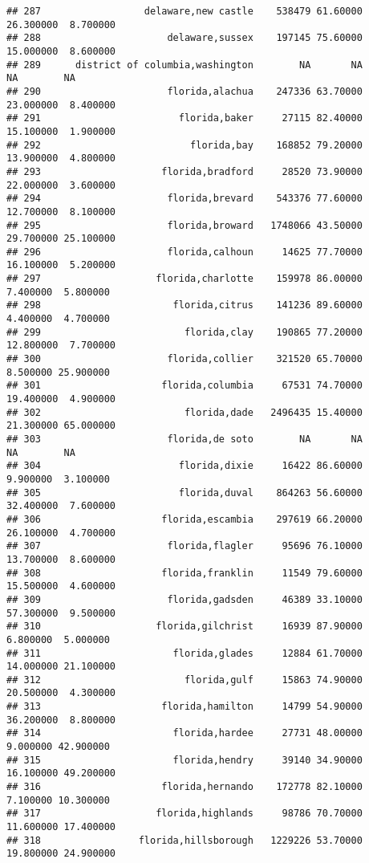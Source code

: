 \documentclass[
]{article}
\begin{document}
\begin{verbatim}
## 287                  delaware,new castle    538479 61.60000 26.300000  8.700000
## 288                      delaware,sussex    197145 75.60000 15.000000  8.600000
## 289      district of columbia,washington        NA       NA        NA        NA
## 290                      florida,alachua    247336 63.70000 23.000000  8.400000
## 291                        florida,baker     27115 82.40000 15.100000  1.900000
## 292                          florida,bay    168852 79.20000 13.900000  4.800000
## 293                     florida,bradford     28520 73.90000 22.000000  3.600000
## 294                      florida,brevard    543376 77.60000 12.700000  8.100000
## 295                      florida,broward   1748066 43.50000 29.700000 25.100000
## 296                      florida,calhoun     14625 77.70000 16.100000  5.200000
## 297                    florida,charlotte    159978 86.00000  7.400000  5.800000
## 298                       florida,citrus    141236 89.60000  4.400000  4.700000
## 299                         florida,clay    190865 77.20000 12.800000  7.700000
## 300                      florida,collier    321520 65.70000  8.500000 25.900000
## 301                     florida,columbia     67531 74.70000 19.400000  4.900000
## 302                         florida,dade   2496435 15.40000 21.300000 65.000000
## 303                      florida,de soto        NA       NA        NA        NA
## 304                        florida,dixie     16422 86.60000  9.900000  3.100000
## 305                        florida,duval    864263 56.60000 32.400000  7.600000
## 306                     florida,escambia    297619 66.20000 26.100000  4.700000
## 307                      florida,flagler     95696 76.10000 13.700000  8.600000
## 308                     florida,franklin     11549 79.60000 15.500000  4.600000
## 309                      florida,gadsden     46389 33.10000 57.300000  9.500000
## 310                    florida,gilchrist     16939 87.90000  6.800000  5.000000
## 311                       florida,glades     12884 61.70000 14.000000 21.100000
## 312                         florida,gulf     15863 74.90000 20.500000  4.300000
## 313                     florida,hamilton     14799 54.90000 36.200000  8.800000
## 314                       florida,hardee     27731 48.00000  9.000000 42.900000
## 315                       florida,hendry     39140 34.90000 16.100000 49.200000
## 316                     florida,hernando    172778 82.10000  7.100000 10.300000
## 317                    florida,highlands     98786 70.70000 11.600000 17.400000
## 318                 florida,hillsborough   1229226 53.70000 19.800000 24.900000

\end{verbatim}
\end{document}
